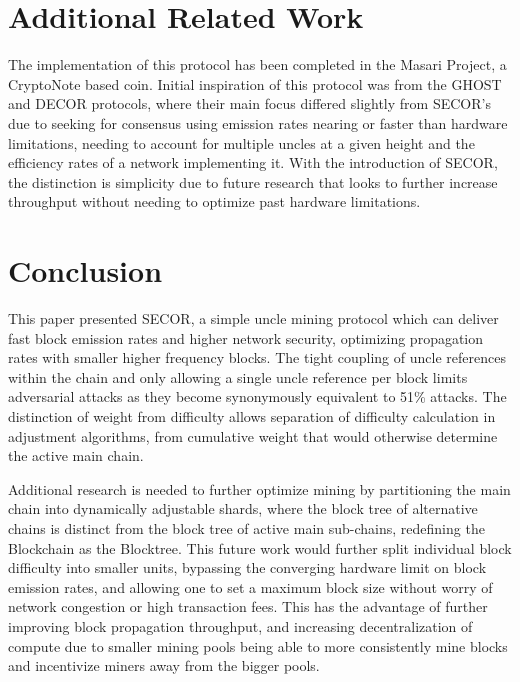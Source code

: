 \documentclass{article}
\begin{document}
\section{Additional Related Work}
The implementation of this protocol has been completed in the Masari Project, a CryptoNote based coin. Initial inspiration of this protocol was from the GHOST and DECOR protocols, where their main focus differed slightly from SECOR's due to seeking for consensus using emission rates nearing or faster than hardware limitations, needing to account for multiple uncles at a given height and the efficiency rates of a network implementing it\cite{sompolinsky}\cite{sdlerner}\cite{ethereum}. With the introduction of SECOR, the distinction is simplicity due to future research that looks to further increase throughput without needing to optimize past hardware limitations.

\section{Conclusion}
This paper presented SECOR, a simple uncle mining protocol which can deliver fast block emission rates and higher network security, optimizing propagation rates with smaller higher frequency blocks. The tight coupling of uncle references within the chain and only allowing a single uncle reference per block limits adversarial attacks as they become synonymously equivalent to 51\% attacks. The distinction of weight from difficulty allows separation of difficulty calculation in adjustment algorithms, from cumulative weight that would otherwise determine the active main chain.

Additional research is needed to further optimize mining by partitioning the main chain into dynamically adjustable shards, where the block tree of alternative chains is distinct from the block tree of active main sub-chains, redefining the Blockchain as the Blocktree. This future work would further split individual block difficulty into smaller units, bypassing the converging hardware limit on block emission rates, and allowing one to set a maximum block size without worry of network congestion or high transaction fees. This has the advantage of further improving block propagation throughput, and increasing decentralization of compute due to smaller mining pools being able to more consistently mine blocks and incentivize miners away from the bigger pools.
\end{document}
